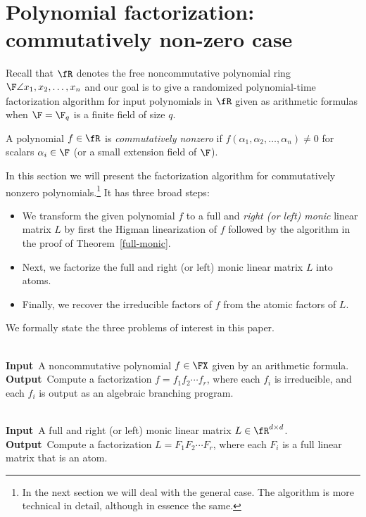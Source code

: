 \section{Polynomial factorization: commutatively non-zero case}\label{cnz-sec}

Recall that $\fR$ denotes the free noncommutative polynomial ring
$\F\angle{x_1,x_2,\ldots,x_n}$ and our goal is to give a randomized
polynomial-time factorization algorithm for input polynomials in $\fR$
given as arithmetic formulas when $\F=\F_q$ is a finite field of size
$q$.

A polynomial $f\in\fR$ is \emph{commutatively nonzero} if
$f(\alpha_1,\alpha_2,\ldots,\alpha_n)\ne 0$ for scalars $\alpha_i\in
\F$ (or a small extension field of $\F$).

In this section we will present the factorization algorithm for
commutatively nonzero polynomials.\footnote{In the next section we
  will deal with the general case. The algorithm is more technical in
  detail, although in essence the same.}  It has three broad steps:
\begin{itemize}
\item[(i)] We transform the given polynomial $f$ to a full and \emph{right (or left)
  monic} linear matrix $L$ by first the Higman linearization of $f$
  followed by the algorithm in the proof of Theorem~\ref{full-monic}.
\item[(ii)] Next, we factorize the full and right (or left) monic linear matrix $L$
  into atoms.
\item[(iii)] Finally, we recover the irreducible factors of $f$ from
  the atomic factors of $L$.
\end{itemize}  

We formally state the three problems of interest in this paper.

\begin{problem}\hfill{~}\\
\textbf{Input}~A noncommutative polynomial $f\in\FX$ given by an
arithmetic formula.\\
\textbf{Output}~Compute a factorization
$f=f_1f_2\cdots f_r$, where each $f_i$ is irreducible, and each $f_i$
is output as an algebraic branching program.
\end{problem}

\begin{problem}\hfill{~}\\
\textbf{Input}~A full and right (or left) monic linear matrix $L\in\fR^{d\times 
  d}$.\\  
\textbf{Output}~Compute a factorization
$L=F_1F_2\cdots F_r$, where each $F_i$ is a full linear matrix that is
an atom.
\end{problem}

